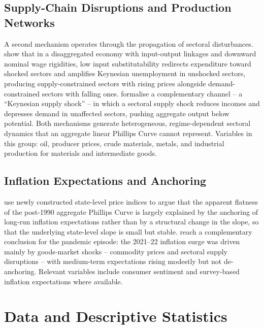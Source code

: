 \documentclass[12pt,a4paper]{article}
\begin{document}
\subsection{Supply-Chain Disruptions and Production Networks}
\label{subsec:theory_supply}

A second mechanism operates through the propagation of sectoral disturbances. \citet{baqaee2022} show that in a disaggregated economy with input-output linkages and downward nominal wage rigidities, low input substitutability redirects expenditure toward shocked sectors and amplifies Keynesian unemployment in unshocked sectors, producing supply-constrained sectors with rising prices alongside demand-constrained sectors with falling ones. \citet{guerrieri2022} formalise a complementary channel -- a ``Keynesian supply shock'' -- in which a sectoral supply shock reduces incomes and depresses demand in unaffected sectors, pushing aggregate output below potential. Both mechanisms generate heterogeneous, regime-dependent sectoral dynamics that an aggregate linear Phillips Curve cannot represent. Variables in this group: oil, producer prices, crude materials, metals, and industrial production for materials and intermediate goods.

\subsection{Inflation Expectations and Anchoring}
\label{subsec:theory_other}

\citet{hazell2022} use newly constructed state-level price indices to argue that the apparent flatness of the post-1990 aggregate Phillips Curve is largely explained by the anchoring of long-run inflation expectations rather than by a structural change in the slope, so that the underlying state-level slope is small but stable. \citet{bernanke2023} reach a complementary conclusion for the pandemic episode: the 2021--22 inflation surge was driven mainly by goods-market shocks -- commodity prices and sectoral supply disruptions -- with medium-term expectations rising modestly but not de-anchoring. Relevant variables include consumer sentiment and survey-based inflation expectations where available.

\FloatBarrier
\section{Data and Descriptive Statistics}
\label{sec:data}
\end{document}
